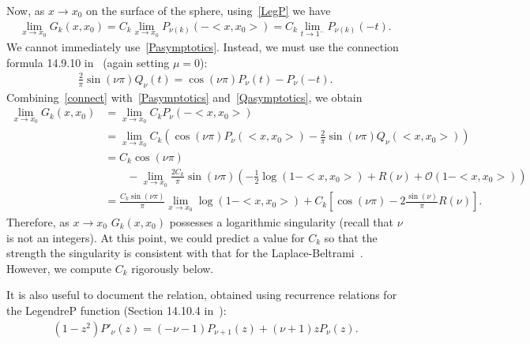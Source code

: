 \documentclass[final]{siamltex}
\newcommand{\C}{C_k}
\newcommand{\bigO} {\mathcal{O}}
\begin{document}
Now, as $x\rightarrow x_{0}$ on the surface of the sphere,
using~\eqref{LegP} we have 
\begin{align*}
  \lim_{x\rightarrow x_{0}}G_k(x,x_{0}) =
  \C\lim_{x\rightarrow x_{0}} P_{\nu(k)}\left(-<x,x_{0}>\right) =
  \C\lim_{t\rightarrow 1^-}P_{\nu(k)}\left(-t\right).
\end{align*}
We cannot immediately use~\eqref{Pasymptotics}. Instead, we must use the connection formula 14.9.10 in~\cite{fatAbramowitz} (again setting $\mu=0$):
\begin{align}
  \label{connect}
  \frac{2}{\pi}\sin(\nu \pi)Q_\nu(t)= \cos(\nu\pi)P_\nu(t) - P_\nu(-t).
\end{align}
Combining~\eqref{connect} with~\eqref{Pasymptotics}
and~\eqref{Qasymptotics}, we obtain
\begin{align}
  \lim_{x\rightarrow x_{0}}G_k(x,x_{0}) &= \lim_{x\rightarrow x_{0}}
      \C P_{\nu}(-<x,x_{0}>) \nonumber \\
  &= \lim_{x\rightarrow x_{0} }\C\left(\cos(\nu\pi)
  P_{\nu}(<x,x_{0}>) - 
      \frac{2}{\pi}\sin(\nu \pi)Q_{\nu}(<x,x_0>)\right) \nonumber \\
  &= \C\cos(\nu\pi)  \\
  & \qquad - \lim_{x\rightarrow x_0} \frac{2\C}{\pi}\sin(\nu\pi)\left(-\frac{1}{2}\log(1-<x,x_0>) + R(\nu) +
      \bigO(1-<x,x_0>)\right) \nonumber \\
  &=\frac{\C\sin(\nu\pi)}{\pi}\lim_{x\rightarrow x_0}
      \log(1-<x,x_0>) + \C\left[\cos(\nu\pi)-
      2\frac{\sin(\nu)}{\pi}R(\nu)\right].
  \label{e:logSingularity}
\end{align}
Therefore, as $x\rightarrow x_0$
$G_k(x,x_0)$ possesses a logarithmic singularity (recall that $\nu$ is not an integers).  At this point, we
could predict a value for $\C$ so that the strength the singularity is
consistent with that for the Laplace-Beltrami~\cite{gemmrich}.
However, we compute $\C$ rigorously below.

It is also useful to document the relation, obtained using recurrence
relations for the LegendreP function (Section 14.10.4
in~\cite{fatAbramowitz}):
\begin{align*} 
  (1-z^2) P'_\nu(z) = (-\nu-1) P_{\nu+1}(z) + (\nu+1)z P_\nu(z).
\end{align*}
\end{document}
